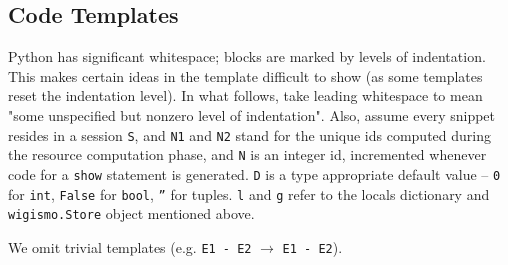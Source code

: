 \documentclass{WigReport}
\begin{document}
\subsection{Code Templates}
Python has significant whitespace; blocks are marked by levels of
indentation. This makes certain ideas in the template difficult to show
(as some templates reset the indentation level). In what follows, take
leading whitespace to mean "some unspecified but nonzero level of
indentation". Also, assume every snippet resides in a session {\tt S},
and {\tt N1} and {\tt N2} stand for the unique ids computed during the
resource computation phase, and {\tt N} is an integer id, incremented
whenever code for a {\tt show} statement is generated. {\tt D} is a type
appropriate default value -- {\tt 0} for {\tt int}, {\tt False} for
{\tt bool}, {\tt ''} for tuples. {\tt l} and {\tt g} refer to the locals
dictionary and {\tt wigismo.Store} object mentioned above.

We omit trivial templates (e.g. {\tt E1 - E2} $\rightarrow$ {\tt E1 - E2}).
\end{document}
